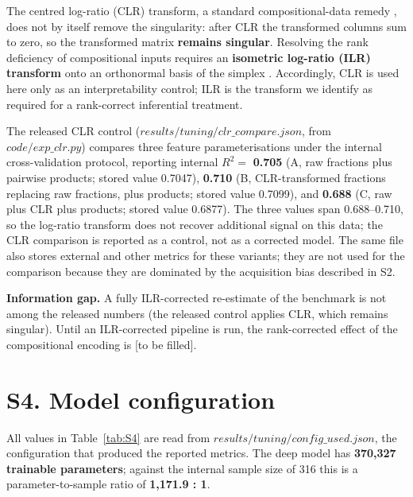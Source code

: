 \documentclass[utf8]{frontiers_suppmat}
\begin{document}
The centred log-ratio (CLR) transform, a standard compositional-data remedy \cite{aitchison1986}, does not by itself remove the singularity: after CLR the transformed columns sum to zero, so the transformed matrix \textbf{remains singular}. Resolving the rank deficiency of compositional inputs requires an \textbf{isometric log-ratio (ILR) transform} onto an orthonormal basis of the simplex \cite{egozcue2003}. Accordingly, CLR is used here only as an interpretability control; ILR is the transform we identify as required for a rank-correct inferential treatment.

The released CLR control ($results/tuning/clr\_compare.json$, from $code/exp\_clr.py$) compares three feature parameterisations under the internal cross-validation protocol, reporting internal $R^2 = $ \textbf{0.705} (A, raw fractions plus pairwise products; stored value 0.7047), \textbf{0.710} (B, CLR-transformed fractions replacing raw fractions, plus products; stored value 0.7099), and \textbf{0.688} (C, raw plus CLR plus products; stored value 0.6877). The three values span 0.688--0.710, so the log-ratio transform does not recover additional signal on this data; the CLR comparison is reported as a control, not as a corrected model. The same file also stores external and other metrics for these variants; they are not used for the comparison because they are dominated by the acquisition bias described in S2.

\textbf{Information gap.} A fully ILR-corrected re-estimate of the benchmark is not among the released numbers (the released control applies CLR, which remains singular). Until an ILR-corrected pipeline is run, the rank-corrected effect of the compositional encoding is {[}to be filled{]}.

\section{S4. Model configuration}

All values in Table~\ref{tab:S4} are read from $results/tuning/config\_used.json$, the configuration that produced the reported metrics. The deep model has \textbf{370,327 trainable parameters}; against the internal sample size of 316 this is a parameter-to-sample ratio of \textbf{1,171.9 : 1}.
\end{document}

